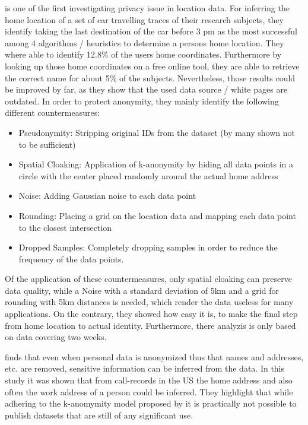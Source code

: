 \parencite{krumm} is one of the first investigating privacy issue in location data. For inferring the home location of a set of car travelling traces of their research subjects, they identify taking the last destination of the car before 3 pm as the most successful among 4 algorithms / heuristics to determine a persons home location. They where able to identify 12.8\% of the users home coordinates. Furthermore by looking up those home coordinates on a free online tool, they are able to retrieve the correct name for about 5\% of the subjects. Nevertheless, those results could be improved by far, as they show that the used data source / white pages are outdated.
In order to protect anonymity, they mainly identify the following different countermeasures:
\begin{itemize}
	\item Pseudonymity: Stripping original IDs from the dataset (by many shown not to be sufficient)
	\item Spatial Cloaking: Application of k-anonymity by hiding all data points in a circle with the center placed randomly around the actual home address
	\item Noise: Adding Gaussian noise to each data point
	\item Rounding: Placing a grid on the location data and mapping each data point to the closest intersection
	\item Dropped Samples: Completely dropping samples in order to reduce the frequency of the data points.
\end{itemize}
Of the application of these countermeasures, only spatial cloaking can preserve data quality, while a Noise with a standard deviation of 5km and a grid for rounding with 5km distances is needed, which render the data useless for many applications.
On the contrary, they showed how easy it is, to make the final step from home location to actual identity. Furthermore, there analyzis is only based on data covering two weeks.


\parencite{cellphone} finds that even when personal data is anonymized thus that names and addresses, etc. are removed, sensitive information can be inferred from the data.
In this study it was shown that from call-records in the US the home address and also often the work address of a person could be inferred.
They highlight that while adhering to the k-anomymity model proposed by \parencite{k-anonymity} it is practically not possible to publish datasets that are still of any significant use.
\\

